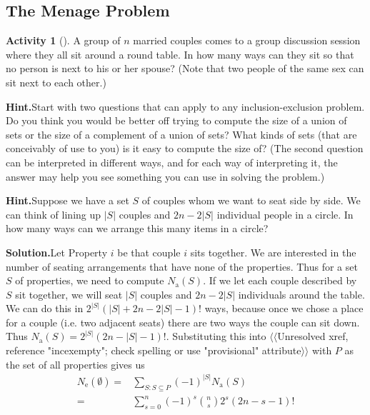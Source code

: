 \documentclass[10pt,]{book}
\theoremstyle{plain}
\theoremstyle{definition}
\newtheorem{activity}[project]{Activity}
\numberwithin{equation}{chapter}
\newcommand{\amp}{&}
\begin{document}
\subsection[{The Menage Problem}]{The Menage Problem}\label{sec-menage}
\begin{activity}[]\label{relaxedmenage}
A group of \(n\) married couples comes to a group discussion session where they all sit around a round table. In how many ways can they sit so that no person is next to his or her spouse? (Note that two people of the same sex can sit next to each other.)%
\par\medskip\noindent%
\textbf{Hint.}\quad Start with two questions that can apply to any inclusion-exclusion problem. Do you think you would be better off trying to compute the size of a union of sets or the size of a complement of a union of sets? What kinds of sets (that are conceivably of use to you) is it easy to compute the size of? (The second question can be interpreted in different ways, and for each way of interpreting it, the answer may help you see something you can use in solving the problem.)%
\par\medskip\noindent%
\textbf{Hint.}\quad Suppose we have a set \(S\) of couples whom we want to seat side by side. We can think of lining up \(|S|\) couples and \(2n − 2|S|\) individual people in a circle.  In how many ways can we arrange this many items in a circle?%
\par\medskip\noindent%
\textbf{Solution.}\quad Let Property \(i\) be that couple \(i\) sits together. We are interested in the number of seating arrangements that have none of the properties. Thus for a set \(S\) of properties, we need to compute \(N_{\mbox{a} }(S)\). If we let each couple described by \(S\) sit together, we will seat \(|S|\) couples and \(2n-2|S|\) individuals around the table. We can do this in \(2^{|S|}(|S| + 2n-2 |S|-1)!\) ways, because once we chose a place for a couple (i.e. two adjacent seats) there are two ways the couple can sit down. Thus \(N_{\mbox{a} }(S) =2^{|S|}(2n-|S|-1)!\). Substituting this into {$\langle\langle$Unresolved xref, reference "incexempty"; check spelling or use "provisional" attribute$\rangle\rangle$} with \(P\) as the set of all properties gives us%
\begin{align*}
N_{\mbox{e} }(\emptyset)  =\amp  \sum_{S:S\subseteq P}
(-1)^{|S|} N_{\mbox{a} }(S)\\
=\amp \sum_{s=0}^n(-1)^s\binom{n}{s}2^{s}(2n- s-1)!
\end{align*}
%
\end{activity}
\end{document}
